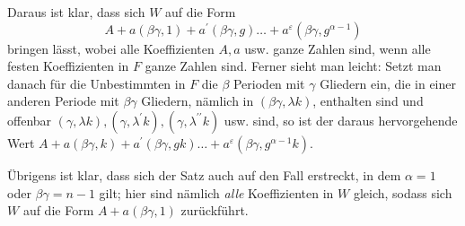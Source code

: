 Daraus ist klar, dass sich \(W\) auf die Form \[A+a(\beta\gamma,1)+a^{\prime}(\beta\gamma,g)\ldots+a^\varepsilon(\beta\gamma,g^{\alpha-1})\] bringen lässt, wobei alle Koeffizienten \(A,\allowbreak a\) usw. ganze Zahlen sind, wenn alle festen Koeffizienten in \(F\) ganze Zahlen sind. Ferner sieht man leicht: Setzt man danach für die Unbestimmten in \(F\) die \(\beta\) Perioden mit \(\gamma\) Gliedern ein, die in einer anderen Periode mit \(\beta\gamma\) Gliedern, nämlich in \((\beta\gamma,\lambda k)\), enthalten sind und offenbar \((\gamma,\lambda k),\allowbreak (\gamma,\lambda^{\prime}k),\allowbreak (\gamma,\lambda^{\prime\prime}k)\) usw. sind, so ist der daraus hervorgehende Wert \(A+a(\beta\gamma,k)+a^{\prime}(\beta\gamma,gk)\ldots+a^\varepsilon(\beta\gamma,g^{\alpha-1}k)\).

Übrigens ist klar, dass sich der Satz auch auf den Fall erstreckt, in dem \(\alpha=1\) oder \(\beta\gamma=n-1\) gilt; hier sind nämlich \textit{alle} Koeffizienten in \(W\) gleich, sodass sich \(W\) auf die Form \(A+a(\beta\gamma,1)\) zurückführt.


